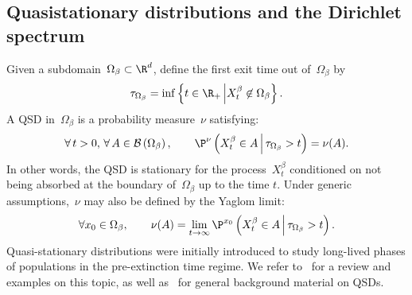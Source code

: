     \subsection{Quasistationary distributions and the Dirichlet spectrum}
    \label{02:subsec:qsd}
    Given a subdomain~$\Omega_\beta\subset \R^d$, define the first exit time out of~$\Omega_\beta$ by
    \[\tau_{\Omega_\beta} = \inf\left\{t\in \R_+\,\middle| X^\beta_t\not\in \Omega_\beta\right\}.\]
    A QSD in~$\Omega_\beta$ is a probability measure~$\nu$ satisfying:
    \begin{equation}
        \label{02:eq:qsd}
        \forall\,t>0,\,\forall\,A \in \mathcal B\left(\Omega_\beta\right),\qquad \P^\nu\left(X^\beta_t\in A\,\middle|\,\tau_{\Omega_\beta}>t\right) = \nu(A).
    \end{equation}
    In other words, the QSD is stationary for the process~$X^\beta_t$ conditioned on not being absorbed at the boundary of~$\Omega_\beta$ up to the time $t$.
    Under generic assumptions,~$\nu$ may also be defined by the Yaglom limit:
    \begin{equation}
        \label{02:eq:yaglom}
        \forall x_0\in\Omega_\beta,\qquad\nu(A) = \underset{t\to\infty}{\lim}\,\P^{x_0}\left(X^\beta_t\in A\,\middle|\,\tau_{\Omega_\beta}>t\right).
    \end{equation}
    Quasi-stationary distributions were initially introduced to study long-lived phases of populations in the pre-extinction time regime.
    We refer to~\cite{MV12} for a review and examples on this topic, as well as~\cite{CMSM13} for general background material on QSDs.

